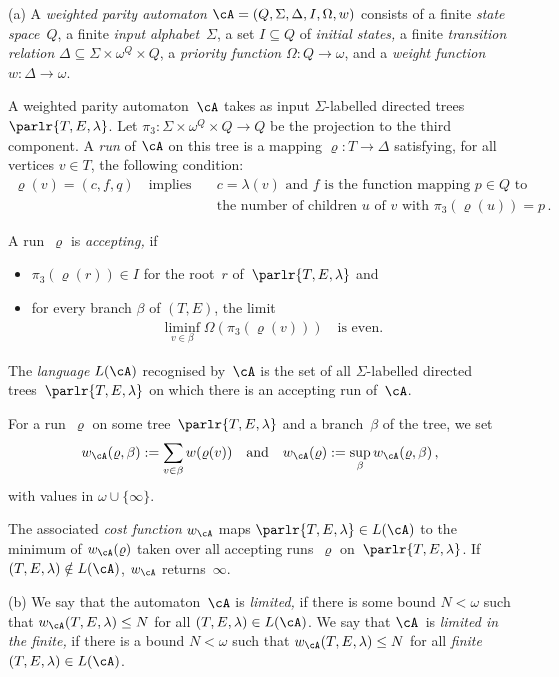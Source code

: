 \documentclass{LMCS}
\begin{document}
\begin{defi}
\textup{(a)}
A \emph{weighted parity automaton} $\cA = (Q,\Sigma,\Delta,I,\Omega,w)$ consists
of a finite \emph{state space}~$Q$, a finite \emph{input alphabet}~$\Sigma$,
a set $I \subseteq Q$ of \emph{initial states,}
a finite \emph{transition relation}
$\Delta \subseteq \Sigma\times\omega^Q\times Q$,
a \emph{priority function} $\Omega : Q \to \omega$,
and a \emph{weight function} $w: \Delta\to\omega$.

A weighted parity automaton~$\cA$ takes as input 
$\Sigma$-labelled directed trees $\parlr{T,E,\lambda}$.
Let $\pi_3 : \Sigma\times\omega^Q \times Q \to Q$ be the projection
to the third component.
A \emph{run} of $\cA$ on this tree is a mapping $\varrho:T\to\Delta$
satisfying, for all vertices $v \in T$, the following condition\?:
\begin{align*}
  \varrho(v) = (c,f,q)
  \quad\text{implies}\quad
  &c = \lambda(v) \text{ and } f \text{ is the function mapping } p \in Q
  \text{ to} \\
  &\text{the number of children } u \text{ of } v \text{ with }
   \pi_3(\varrho(u)) = p\,.
\end{align*}

A run~$\varrho$ is \emph{accepting,} if
\begin{itemize}
\item $\pi_3(\varrho(r)) \in I$ for the root~$r$ of~$\parlr{T,E,\lambda}$ and
\item for every branch $\beta$ of $(T,E)$, the limit
  \begin{align*}
    \liminf_{v \in \beta} \Omega(\pi_3(\varrho(v))) \quad\text{is even.}
  \end{align*}
\end{itemize}
The \emph{language} $L(\cA)$ recognised by~$\cA$
is the set of all $\Sigma$-labelled directed trees~$\parlr{T,E,\lambda}$
on which there is an accepting run of~$\cA$.

For a run~$\varrho$ on some tree~$\parlr{T,E,\lambda}$
and a branch~$\beta$ of the tree, we set
\begin{align*}
  w_\cA(\varrho,\beta) := \sum_{v\in\beta} w(\varrho(v))
  \quad\text{and}\quad
  w_\cA(\varrho) := \sup_\beta w_\cA(\varrho,\beta)\,,
\end{align*}
with values in $\omega \cup \{ \infty \}$.

The associated \emph{cost function} $w_\cA$ maps 
$\parlr{T,E,\lambda} \in L(\cA)$ to
the minimum of $w_\cA(\varrho)$ 
taken over all accepting runs~$\varrho$ on~$\parlr{T,E,\lambda}$.
If $(T,E,\lambda) \notin L(\cA)$, $w_\cA$ returns~$\infty$.

\textup{(b)}
We say that the automaton~$\cA$ is \emph{limited,}
if there is some bound $N < \omega$
such that $w_\cA(T,E,\lambda) \leq N$ for all $(T,E,\lambda) \in L(\cA)$.
We say that $\cA$~is \emph{limited in the finite,}
if there is a bound $N < \omega$ such that
$w_\cA(T,E,\lambda) \leq N$ for all \emph{finite} $(T,E,\lambda) \in L(\cA)$.
\end{defi}
\end{document}
